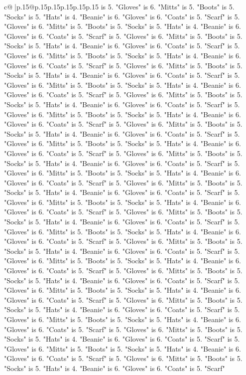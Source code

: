 \documentclass{article}
\begin{document}
{\begin{supertabular}{c@{$\;$}|p{.15\linewidth}@{}p{.15\linewidth}p{.15\linewidth}p{.15\linewidth}p{.15\linewidth}p{.15\linewidth}}
{{{is 5. "Gloves" is 6. "Mitts" is 5. "Boots" is 5. "Socks" is 5. "Hats" is 4. "Beanie" is 6. "Gloves" is 6. "Coats" is 5. "Scarf" is 5. "Gloves" is 6. "Mitts" is 5. "Boots" is 5. "Socks" is 5. "Hats" is 4. "Beanie" is 6. "Gloves" is 6. "Coats" is 5. "Scarf" is 5. "Gloves" is 6. "Mitts" is 5. "Boots" is 5. "Socks" is 5. "Hats" is 4. "Beanie" is 6. "Gloves" is 6. "Coats" is 5. "Scarf" is 5. "Gloves" is 6. "Mitts" is 5. "Boots" is 5. "Socks" is 5. "Hats" is 4. "Beanie" is 6. "Gloves" is 6. "Coats" is 5. "Scarf" is 5. "Gloves" is 6. "Mitts" is 5. "Boots" is 5. "Socks" is 5. "Hats" is 4. "Beanie" is 6. "Gloves" is 6. "Coats" is 5. "Scarf" is 5. "Gloves" is 6. "Mitts" is 5. "Boots" is 5. "Socks" is 5. "Hats" is 4. "Beanie" is 6. "Gloves" is 6. "Coats" is 5. "Scarf" is 5. "Gloves" is 6. "Mitts" is 5. "Boots" is 5. "Socks" is 5. "Hats" is 4. "Beanie" is 6. "Gloves" is 6. "Coats" is 5. "Scarf" is 5. "Gloves" is 6. "Mitts" is 5. "Boots" is 5. "Socks" is 5. "Hats" is 4. "Beanie" is 6. "Gloves" is 6. "Coats" is 5. "Scarf" is 5. "Gloves" is 6. "Mitts" is 5. "Boots" is 5. "Socks" is 5. "Hats" is 4. "Beanie" is 6. "Gloves" is 6. "Coats" is 5. "Scarf" is 5. "Gloves" is 6. "Mitts" is 5. "Boots" is 5. "Socks" is 5. "Hats" is 4. "Beanie" is 6. "Gloves" is 6. "Coats" is 5. "Scarf" is 5. "Gloves" is 6. "Mitts" is 5. "Boots" is 5. "Socks" is 5. "Hats" is 4. "Beanie" is 6. "Gloves" is 6. "Coats" is 5. "Scarf" is 5. "Gloves" is 6. "Mitts" is 5. "Boots" is 5. "Socks" is 5. "Hats" is 4. "Beanie" is 6. "Gloves" is 6. "Coats" is 5. "Scarf" is 5. "Gloves" is 6. "Mitts" is 5. "Boots" is 5. "Socks" is 5. "Hats" is 4. "Beanie" is 6. "Gloves" is 6. "Coats" is 5. "Scarf" is 5. "Gloves" is 6. "Mitts" is 5. "Boots" is 5. "Socks" is 5. "Hats" is 4. "Beanie" is 6. "Gloves" is 6. "Coats" is 5. "Scarf" is 5. "Gloves" is 6. "Mitts" is 5. "Boots" is 5. "Socks" is 5. "Hats" is 4. "Beanie" is 6. "Gloves" is 6. "Coats" is 5. "Scarf" is 5. "Gloves" is 6. "Mitts" is 5. "Boots" is 5. "Socks" is 5. "Hats" is 4. "Beanie" is 6. "Gloves" is 6. "Coats" is 5. "Scarf" is 5. "Gloves" is 6. "Mitts" is 5. "Boots" is 5. "Socks" is 5. "Hats" is 4. "Beanie" is 6. "Gloves" is 6. "Coats" is 5. "Scarf" is 5. "Gloves" is 6. "Mitts" is 5. "Boots" is 5. "Socks" is 5. "Hats" is 4. "Beanie" is 6. "Gloves" is 6. "Coats" is 5. "Scarf" is 5. "Gloves" is 6. "Mitts" is 5. "Boots" is 5. "Socks" is 5. "Hats" is 4. "Beanie" is 6. "Gloves" is 6. "Coats" is 5. "Scarf" is 5. "Gloves" is 6. "Mitts" is 5. "Boots" is 5. "Socks" is 5. "Hats" is 4. "Beanie" is 6. "Gloves" is 6. "Coats" is 5. "Scarf" is 5. "Gloves" is 6. "Mitts" is 5. "Boots" is 5. "Socks" is 5. "Hats" is 4. "Beanie" is 6. "Gloves" is 6. "Coats" is 5. "Scarf" is 5. "Gloves" is 6. "Mitts" is 5. "Boots" is 5. "Socks" is 5. "Hats" is 4. "Beanie" is 6. "Gloves" is 6. "Coats" is 5. "Scarf" is 5. "Gloves" is 6. "Mitts" is 5. "Boots" is 5. "Socks" is 5. "Hats" is 4. "Beanie" is 6. "Gloves" is 6. "Coats" is 5. "Scarf" is 5. "Gloves" is 6. "Mitts" is 5. "Boots" is 5. "Socks" is 5. "Hats" is 4. "Beanie" is 6. "Gloves" is 6. "Coats" is 5. "Scarf" is 5. "Gloves" is 6. "Mitts" is 5. "Boots" is 5. "Socks" is 5. "Hats" is 4. "Beanie" is 6. "Gloves" is 6. "Coats" is 5. "Scarf" }}}
\end{supertabular}}
\end{document}
